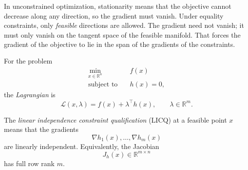 \begin{intuition}
	In unconstrained optimization, stationarity means that the objective cannot decrease along any direction, so the gradient must vanish. Under equality constraints, only \emph{feasible} directions are allowed. The gradient need not vanish; it must only vanish on the tangent space of the feasible manifold. That forces the gradient of the objective to lie in the span of the gradients of the constraints.
\end{intuition}

\begin{definition}\label{def:l3-lagrangian-for-equality-constraints}
	For the problem
	\begin{align*}
		\min_{x \in \mathbb{R}^n}\quad & f(x) \\
		\text{subject to}\quad & h(x)=0,
	\end{align*}
	the \emph{Lagrangian} is
	\[
		\mathcal{L}(x,\lambda)=f(x)+\lambda^\top h(x),
		\qquad
		\lambda \in \mathbb{R}^m.
	\]
\end{definition}

\begin{definition}\label{def:l3-licq-for-equality-constraints}
	The \emph{linear independence constraint qualification} (LICQ) at a feasible point $x$ means that the gradients
	\[
		\nabla h_1(x),\dots,\nabla h_m(x)
	\]
	are linearly independent. Equivalently, the Jacobian
	\[
		J_h(x) \in \mathbb{R}^{m \times n}
	\]
	has full row rank $m$.
\end{definition}

